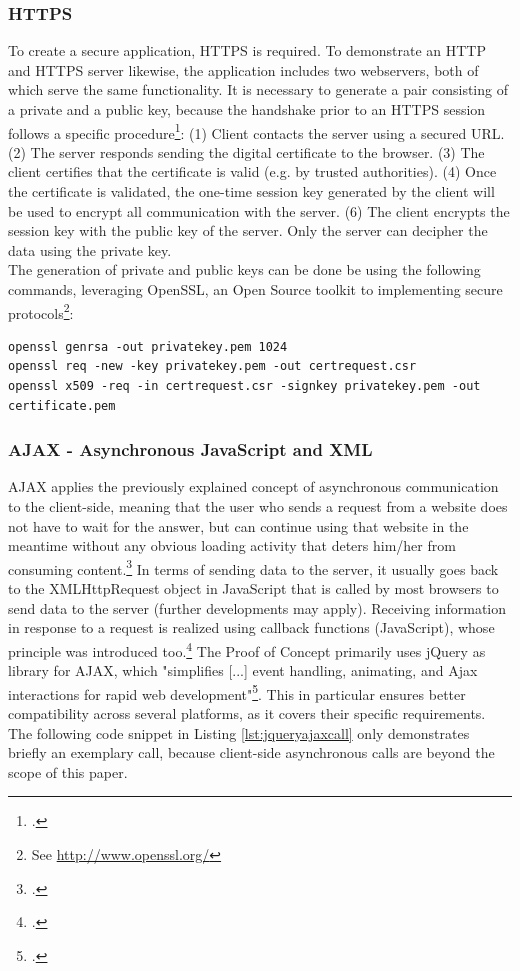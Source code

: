 \subsubsection{HTTPS}
To create a secure application, HTTPS is required. To demonstrate an HTTP and
HTTPS server likewise, the application includes two webservers, both of which
serve the same functionality. It is necessary to generate a pair consisting of a
private and a public key, because the handshake prior to an HTTPS session
follows a specific procedure\footcite[Cf.][]{Nemati_2011}:
 (1) Client contacts the server using a secured URL.
 (2) The server responds sending the digital certificate to the browser.
 (3) The client certifies that the certificate is valid (e.g. by trusted
 authorities).
 (4) Once the certificate is validated, the one-time session key generated by
 the client will be used to encrypt all communication with the server.
 (6) The client encrypts the session key with the public key of the server. Only
 the server can decipher the data using the private key.\\
The generation of private and public keys can be done be using the following
commands, leveraging OpenSSL, an Open Source toolkit to implementing secure
protocols\footnote{See \url{ http://www.openssl.org/}}:\\

\begin{lstlisting}[caption={Generating a new pair of public/private keys}]
openssl genrsa -out privatekey.pem 1024
openssl req -new -key privatekey.pem -out certrequest.csr 
openssl x509 -req -in certrequest.csr -signkey privatekey.pem -out certificate.pem
\end{lstlisting}

\subsubsection{AJAX - Asynchronous JavaScript and XML}
AJAX applies the previously explained concept of asynchronous communication to the client-side, meaning that the user who sends a request from a website does not have to wait for the answer, but can continue using that website in the meantime without any obvious loading activity that deters him/her from consuming content.\footcite[Cf.][46]{riordan2008head} In terms of sending data to the server, it usually goes back to the XMLHttpRequest object in JavaScript that is called by most browsers to send data to the server (further developments may apply). Receiving information in response to a request is realized using callback functions (JavaScript), whose principle was introduced too.\footcite[Cf.][21]{riordan2008head} The Proof of Concept primarily uses jQuery as library for AJAX, which "simplifies [...] event handling, animating, and Ajax interactions for rapid web development"\footcite[Cf.][]{jquery2013}. This in particular ensures better compatibility across several platforms, as it covers their specific requirements. The following code snippet in Listing \ref{lst:jqueryajaxcall} only demonstrates briefly an exemplary call, because client-side asynchronous calls are beyond the scope of this paper.

